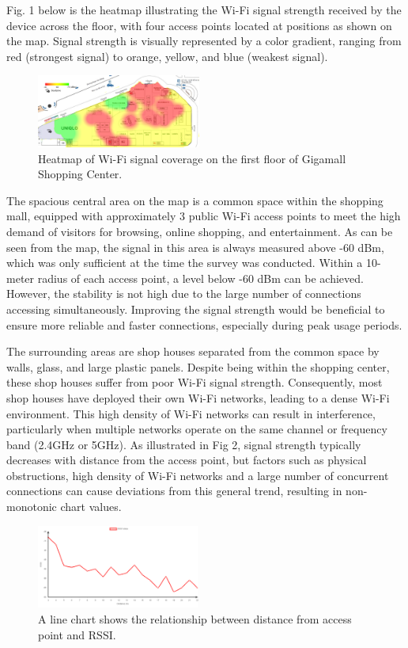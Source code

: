 \documentclass[conference]{IEEEtran}
\begin{document}
Fig. 1 below is the heatmap illustrating the Wi-Fi signal strength received by the device across the floor, with four access points located at positions as shown on the map. Signal strength is visually represented by a color gradient, ranging from red (strongest signal) to orange, yellow, and blue (weakest signal).

\begin{figure}[htbp]
    \centering
    \includegraphics[width=0.48\textwidth]{fig1_heatmap.png}
    \caption{Heatmap of Wi-Fi signal coverage on the first floor of Gigamall Shopping Center.}
\end{figure}

The spacious central area on the map is a common space within the shopping mall, equipped with approximately 3 public Wi-Fi access points to meet the high demand of visitors for browsing, online shopping, and entertainment. As can be seen from the map, the signal in this area is always measured above -60 dBm, which was only sufficient at the time the survey was conducted. Within a 10-meter radius of each access point, a level below -60 dBm can be achieved. However, the stability is not high due to the large number of connections accessing simultaneously. Improving the signal strength would be beneficial to ensure more reliable and faster connections, especially during peak usage periods.

The surrounding areas are shop houses separated from the common space by walls, glass, and large plastic panels. Despite being within the shopping center, these shop houses suffer from poor Wi-Fi signal strength. Consequently, most shop houses have deployed their own Wi-Fi networks, leading to a dense Wi-Fi environment. This high density of Wi-Fi networks can result in interference, particularly when multiple networks operate on the same channel or frequency band (2.4GHz or 5GHz). As illustrated in Fig 2, signal strength typically decreases with distance from the access point, but factors such as physical obstructions, high density of Wi-Fi networks and a large number of concurrent connections can cause deviations from this general trend, resulting in non-monotonic chart values.

\begin{figure}[htbp]
    \centering
    \includegraphics[width=0.48\textwidth]{fig2_rssi.png}
    \caption{A line chart shows the relationship between distance from access
point and RSSI.}
\end{figure}
\end{document}
